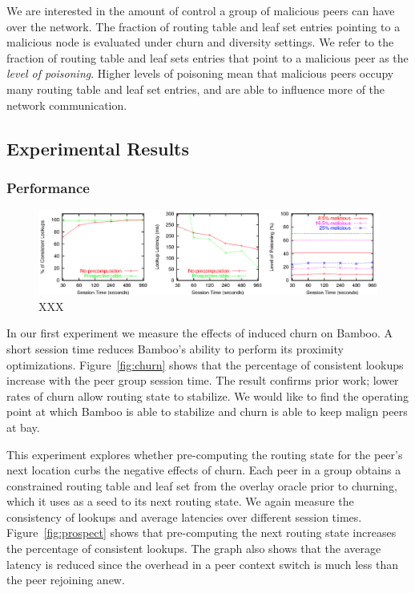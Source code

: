 We are interested in the amount of control a group of malicious peers can have over the network. The fraction of routing table and leaf set entries pointing to a malicious node is evaluated under churn and diversity settings. We refer to the fraction of routing table and leaf sets entries that point to a malicious peer as the \textit{level of poisoning}.  Higher levels of poisoning mean that malicious peers occupy many routing table and leaf set entries, and are able to influence more of the network communication.

\subsection{Experimental Results}

\subsubsection{Performance}


\begin{figure}
\centerline{\includegraphics{results/collective.eps}}
\caption{XXX\label{fig:graphs}}
\end{figure}

In our first experiment we measure the effects of induced churn on Bamboo. A short session time reduces Bamboo's ability to perform its proximity optimizations. Figure~\ref{fig:churn} shows that the percentage of consistent lookups increase with the peer group session time. The result confirms prior work; lower rates of churn allow routing state to stabilize. We would like to find the operating point at which Bamboo is able to stabilize and churn is able to keep malign peers at bay. 

This experiment explores whether pre-computing the routing state for the peer's next location curbs the negative effects of churn. Each peer in a group obtains a constrained routing table and leaf set from the overlay oracle prior to churning, which it uses as a seed to its next routing state. We again measure the consistency of lookups and average latencies over different session times. Figure~\ref{fig:prospect} shows that pre-computing the next routing state increases the percentage of consistent lookups. The graph also shows that the average latency is reduced since the overhead in a peer context switch is much less than the peer rejoining anew.

